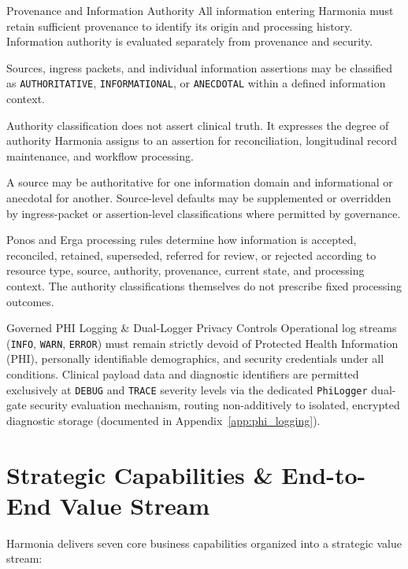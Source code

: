 \begin{principlebox}{Provenance and Information Authority}
All information entering Harmonia must retain sufficient provenance to identify its origin and processing history. Information authority is evaluated separately from provenance and security.

Sources, ingress packets, and individual information assertions may be classified as \texttt{AUTHORITATIVE}, \texttt{INFORMATIONAL}, or \texttt{ANECDOTAL} within a defined information context.

Authority classification does not assert clinical truth. It expresses the degree of authority Harmonia assigns to an assertion for reconciliation, longitudinal record maintenance, and workflow processing.

A source may be authoritative for one information domain and informational or anecdotal for another. Source-level defaults may be supplemented or overridden by ingress-packet or assertion-level classifications where permitted by governance.

Ponos and Erga processing rules determine how information is accepted, reconciled, retained, superseded, referred for review, or rejected according to resource type, source, authority, provenance, current state, and processing context. The authority classifications themselves do not prescribe fixed processing outcomes.
\end{principlebox}

\begin{principlebox}{Governed PHI Logging \& Dual-Logger Privacy Controls}
Operational log streams (\texttt{INFO}, \texttt{WARN}, \texttt{ERROR}) must remain strictly devoid of Protected Health Information (PHI), personally identifiable demographics, and security credentials under all conditions. Clinical payload data and diagnostic identifiers are permitted exclusively at \texttt{DEBUG} and \texttt{TRACE} severity levels via the dedicated \texttt{PhiLogger} dual-gate security evaluation mechanism, routing non-additively to isolated, encrypted diagnostic storage (documented in Appendix~\ref{app:phi_logging}).
\end{principlebox}

\section{Strategic Capabilities \& End-to-End Value Stream}

Harmonia delivers seven core business capabilities organized into a strategic value stream:


